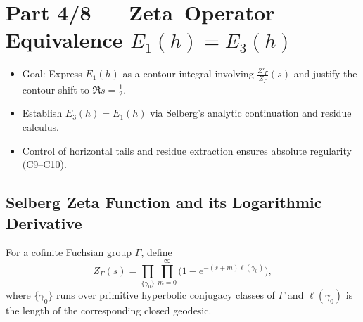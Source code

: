 
\section*{Part 4/8 — Zeta–Operator Equivalence $E_{1}(h)=E_{3}(h)$}\relax\hspace{0pt}

\begin{tcolorbox}[colback=gray!4,colframe=gray!45,title={Core Statement (sealed) • C6–C10}] %
\begin{itemize}
  \item Goal: Express $E_{1}(h)$ as a contour integral involving $\frac{Z'_\Gamma}{Z_\Gamma}(s)$ and justify the contour shift to $\Re s=\tfrac12$. %
  \item Establish $E_{3}(h)=E_{1}(h)$ via Selberg’s analytic continuation and residue calculus. %
  \item Control of horizontal tails and residue extraction ensures absolute regularity (C9–C10). %
\end{itemize}
\end{tcolorbox}

\subsection{Selberg Zeta Function and its Logarithmic Derivative}\relax\hspace{0pt}
\label{subsec:zeta-func}\relax\hspace{0pt}

\begin{definition}\label{def:SelbergZeta}\relax
For a cofinite Fuchsian group $\Gamma$, define
\[
Z_\Gamma(s)=\prod_{\{\gamma_0\}}\prod_{m=0}^\infty\Big(1-e^{-(s+m)\ell(\gamma_0)}\Big),
\]
where $\{\gamma_0\}$ runs over primitive hyperbolic conjugacy classes of $\Gamma$ and $\ell(\gamma_0)$ is the length of the corresponding closed geodesic. %
\end{definition}

